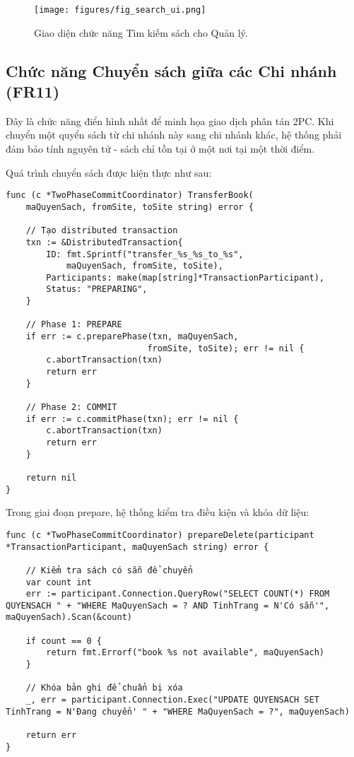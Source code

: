 \documentclass[conference]{IEEEtran}
\begin{document}
\begin{figure}[H]
\centering
\texttt{[image: figures/fig\_search\_ui.png]} 
\caption{Giao diện chức năng Tìm kiếm sách cho Quản lý.}
\label{fig_search_ui}
\end{figure}

\subsection{Chức năng Chuyển sách giữa các Chi nhánh (FR11)}
Đây là chức năng điển hình nhất để minh họa giao dịch phân tán 2PC. Khi chuyển một quyển sách từ chi nhánh này sang chi nhánh khác, hệ thống phải đảm bảo tính nguyên tử - sách chỉ tồn tại ở một nơi tại một thời điểm.

Quá trình chuyển sách được hiện thực như sau:

\begin{Verbatim}[fontsize=\footnotesize,breaklines=true,breakanywhere=true]
func (c *TwoPhaseCommitCoordinator) TransferBook(
    maQuyenSach, fromSite, toSite string) error {
    
    // Tạo distributed transaction
    txn := &DistributedTransaction{
        ID: fmt.Sprintf("transfer_%s_%s_to_%s", 
            maQuyenSach, fromSite, toSite),
        Participants: make(map[string]*TransactionParticipant),
        Status: "PREPARING",
    }
    
    // Phase 1: PREPARE
    if err := c.preparePhase(txn, maQuyenSach, 
                            fromSite, toSite); err != nil {
        c.abortTransaction(txn)
        return err
    }
    
    // Phase 2: COMMIT
    if err := c.commitPhase(txn); err != nil {
        c.abortTransaction(txn)
        return err
    }
    
    return nil
}
\end{Verbatim}

Trong giai đoạn prepare, hệ thống kiểm tra điều kiện và khóa dữ liệu:

\begin{Verbatim}[fontsize=\footnotesize,breaklines=true,breakanywhere=true]
func (c *TwoPhaseCommitCoordinator) prepareDelete(participant *TransactionParticipant, maQuyenSach string) error {

    // Kiểm tra sách có sẵn để chuyển
    var count int
    err := participant.Connection.QueryRow("SELECT COUNT(*) FROM QUYENSACH " + "WHERE MaQuyenSach = ? AND TinhTrang = N'Có sẵn'", maQuyenSach).Scan(&count)

    if count == 0 {
        return fmt.Errorf("book %s not available", maQuyenSach)
    }
    
    // Khóa bản ghi để chuẩn bị xóa
    _, err = participant.Connection.Exec("UPDATE QUYENSACH SET TinhTrang = N'Đang chuyển' " + "WHERE MaQuyenSach = ?", maQuyenSach)

    return err
}
\end{Verbatim}
\end{document}
